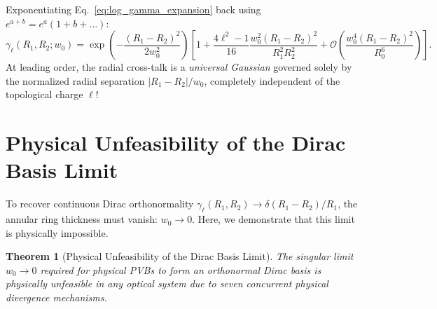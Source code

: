 \documentclass{optica-article}
\newtheorem{theorem}{Theorem}
\begin{document}
Exponentiating Eq.~\eqref{eq:log_gamma_expansion} back using $e^{a + b} = e^a (1 + b + \dots)$:
\begin{equation}
\boxed{\gamma_\ell(R_1, R_2; w_0) = \exp\left( - \frac{(R_1 - R_2)^2}{2 w_0^2} \right) \left[ 1 + \frac{4\ell^2 - 1}{16} \frac{w_0^2 (R_1 - R_2)^2}{R_1^2 R_2^2} + \mathcal{O}\left( \frac{w_0^4 (R_1 - R_2)^2}{R_0^6} \right) \right].}
\label{eq:asymptotic_overlap}
\end{equation}
At leading order, the radial cross-talk is a \emph{universal Gaussian} governed solely by the normalized radial separation $|R_1 - R_2| / w_0$, completely independent of the topological charge $\ell$!

\section{Physical Unfeasibility of the Dirac Basis Limit}
\label{sec:unfeasibility}

To recover continuous Dirac orthonormality $\gamma_\ell(R_1, R_2) \to \delta(R_1 - R_2) / R_1$, the annular ring thickness must vanish: $w_0 \to 0$. Here, we demonstrate that this limit is physically impossible.

\begin{theorem}[Physical Unfeasibility of the Dirac Basis Limit]
\label{thm:unfeasibility}
The singular limit $w_0 \to 0$ required for physical PVBs to form an orthonormal Dirac basis is physically unfeasible in any optical system due to seven concurrent physical divergence mechanisms.
\end{theorem}
\end{document}

